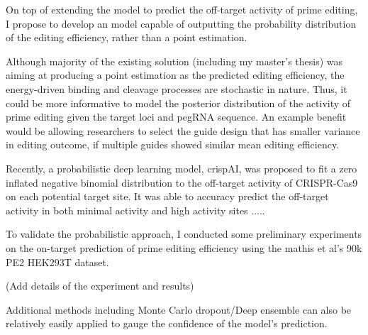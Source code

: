 \documentclass[a4,12pt]{article}
\begin{document}
On top of extending the model to predict the off-target activity of prime editing, I propose to develop an model capable of outputting the probability distribution of the editing efficiency, rather than a point estimation.

Although majority of the existing solution (including my master's thesis) was aiming at producing a point estimation as the predicted editing efficiency\parencite{mathisMachineLearningPrediction2024,yuPredictionEfficienciesDiverse2023,koeppelPredictionPrimeEditing2023}, the energy-driven binding and cleavage processes are stochastic in nature\cite{stortzPiCRISPRPhysicallyInformed2023}. Thus, it could be more informative to model the posterior distribution of the activity of prime editing given the target loci and pegRNA sequence. An example benefit would be allowing researchers to select the guide design that has smaller variance in editing outcome, if multiple guides showed similar mean editing efficiency.

Recently, a probabilistic deep learning model, crispAI, was proposed to fit a zero inflated negative binomial distribution to the off-target activity of CRISPR-Cas9 on each potential target site\parencite{ozdenLearningQuantifyUncertainty2024}. It was able to accuracy predict the off-target activity in both minimal activity and high activity sites .....

To validate the probabilistic approach, I conducted some preliminary experiments on the on-target prediction of prime editing efficiency using the mathis et al's 90k PE2 HEK293T dataset\parencite{mathisPredictingPrimeEditing2023}. 

(Add details of the experiment and results)

Additional methods including Monte Carlo dropout\parencite{galDropoutBayesianApproximation2016}/Deep ensemble can also be relatively easily applied to gauge the confidence of the model's prediction.
\end{document}
